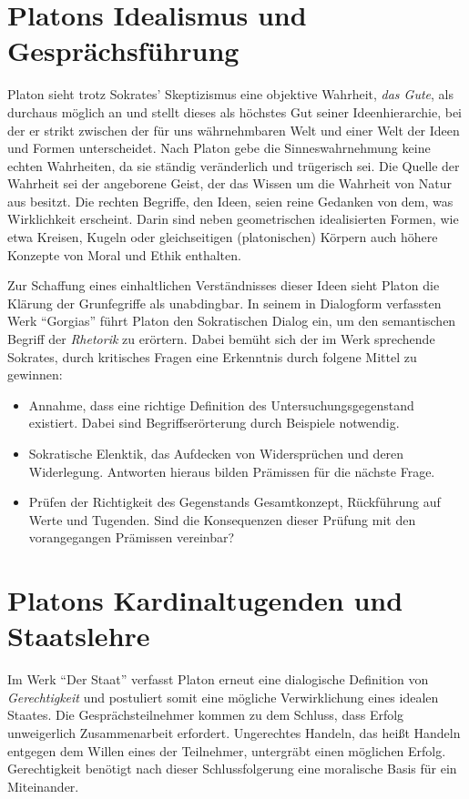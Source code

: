 \section*{Platons Idealismus und Gesprächsführung} 

Platon sieht trotz Sokrates' Skeptizismus eine objektive Wahrheit, \textit{das Gute}, als durchaus möglich an und stellt
dieses als höchstes Gut seiner Ideenhierarchie, bei der er strikt zwischen der für uns währnehmbaren Welt 
und einer Welt der Ideen und Formen unterscheidet. 
Nach Platon gebe die Sinneswahrnehmung keine echten Wahrheiten, da sie ständig veränderlich und trügerisch sei.
Die Quelle der Wahrheit sei der angeborene Geist, der das Wissen um die Wahrheit von Natur aus besitzt.
Die rechten Begriffe, den Ideen, seien reine Gedanken von dem, was Wirklichkeit erscheint.
Darin sind neben geometrischen idealisierten Formen, wie etwa Kreisen, Kugeln oder gleichseitigen (platonischen) Körpern 
auch höhere Konzepte von Moral und Ethik enthalten.

Zur Schaffung eines einhaltlichen Verständnisses dieser Ideen sieht Platon die Klärung der Grunfegriffe als unabdingbar.
In seinem in Dialogform verfassten Werk \enquote{Gorgias} \cite{gorgias} führt Platon den Sokratischen Dialog ein, 
um den semantischen Begriff der \textit{Rhetorik} zu erörtern. 
Dabei bemüht sich der im Werk sprechende Sokrates, durch kritisches Fragen eine Erkenntnis durch folgene Mittel zu gewinnen:

\begin{itemize}
    \item   Annahme, dass eine richtige Definition des Untersuchungsgegenstand existiert.
            Dabei sind Begriffserörterung durch Beispiele notwendig.
    \item   Sokratische Elenktik, das Aufdecken von Widersprüchen und deren Widerlegung. 
            Antworten hieraus bilden Prämissen für die nächste Frage.
    \item   Prüfen der Richtigkeit des Gegenstands Gesamtkonzept, Rückführung auf Werte und Tugenden. 
            Sind die Konsequenzen dieser Prüfung mit den vorangegangen Prämissen vereinbar?
\end{itemize}


\section*{Platons Kardinaltugenden und Staatslehre}

Im Werk \enquote{Der Staat} \cite{politeia} verfasst Platon erneut eine dialogische Definition von \textit{Gerechtigkeit}
und postuliert somit eine mögliche Verwirklichung eines idealen Staates.
Die Gesprächsteilnehmer kommen zu dem Schluss, dass Erfolg unweigerlich Zusammenarbeit erfordert.
Ungerechtes Handeln, das heißt Handeln entgegen dem Willen eines der Teilnehmer, untergräbt einen möglichen Erfolg.
Gerechtigkeit benötigt nach dieser Schlussfolgerung eine moralische Basis für ein Miteinander.

